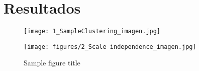 \graphicspath{ {/Users/laura/Desktop/BioSis/TF/project_template_BS_SARS-CoV2/results/} }
\section{Resultados}

	\begin{figure}[h!]
		\texttt{[image: 1\_SampleClustering\_imagen.jpg]}
		
	\end{figure}

	\begin{figure}[h!]
		\texttt{[image: figures/2\_Scale independence\_imagen.jpg]}
		\caption{Sample figure title}
		\label{fig:cost_megabase}
	\end{figure}
